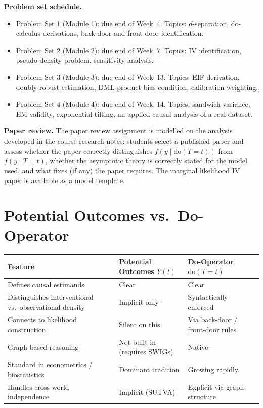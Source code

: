 \documentclass[12pt]{article}
\begin{document}
\medskip
\noindent\textbf{Problem set schedule.}
\begin{itemize}
  \item Problem Set 1 (Module 1): due end of Week~4.
    Topics: $d$-separation, do-calculus derivations, back-door and
    front-door identification.
  \item Problem Set 2 (Module 2): due end of Week~7.
    Topics: IV identification, pseudo-density problem, sensitivity
    analysis.
  \item Problem Set 3 (Module 3): due end of Week~13.
    Topics: EIF derivation, doubly robust estimation, DML product
    bias condition, calibration weighting.
  \item Problem Set 4 (Module 4): due end of Week~14.
    Topics: sandwich variance, EM validity, exponential tilting,
    an applied causal analysis of a real dataset.
\end{itemize}

\noindent\textbf{Paper review.}  The paper review assignment is modelled
on the analysis developed in the course research notes: students select a
published paper and assess whether the paper correctly distinguishes
$f(y \mid \mathrm{do}(T{=}t))$ from $f(y \mid T{=}t)$, whether the
asymptotic theory is correctly stated for the model used, and what fixes
(if any) the paper requires.  The marginal likelihood IV paper is
available as a model template.

\section{Potential Outcomes vs.\ Do-Operator}

\begingroup
\small
\setlength{\tabcolsep}{6pt}
\renewcommand{\arraystretch}{1.4}

\begin{tabularx}{\linewidth}{L{4.5cm} X X}
  \toprule
  \color{white}\textbf{Feature} &
  \color{white}\textbf{Potential Outcomes $Y(t)$} &
  \color{white}\textbf{Do-Operator $\mathrm{do}(T{=}t)$} \\
  \midrule
  Defines causal estimands
    & Clear & Clear \\
  Distinguishes interventional vs.\ observational density
    & Implicit only & Syntactically enforced \\
  Connects to likelihood construction
    & Silent on this & Via back-door / front-door rules \\
  Graph-based reasoning
    & Not built in (requires SWIGs) & Native \\
  Standard in econometrics / biostatistics
    & Dominant tradition & Growing rapidly \\
  Handles cross-world independence
    & Implicit (SUTVA) & Explicit via graph structure \\
  \bottomrule
\end{tabularx}
\endgroup
\end{document}
